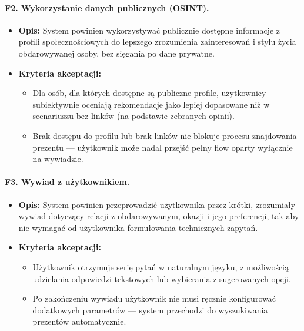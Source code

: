 \documentclass[12pt,a4paper]{article}
\begin{document}
\paragraph{F2. Wykorzystanie danych publicznych (OSINT).}
\begin{itemize}
    \item \textbf{Opis:} System powinien wykorzystywać publicznie dostępne informacje z profili społecznościowych do lepszego zrozumienia zainteresowań i stylu życia obdarowywanej osoby, bez sięgania po dane prywatne.
    \item \textbf{Kryteria akceptacji:}
    \begin{itemize}
        \item Dla osób, dla których dostępne są publiczne profile, użytkownicy subiektywnie oceniają rekomendacje jako lepiej dopasowane niż w scenariuszu bez linków (na podstawie zebranych opinii).
        \item Brak dostępu do profilu lub brak linków nie blokuje procesu znajdowania prezentu — użytkownik może nadal przejść pełny flow oparty wyłącznie na wywiadzie.
    \end{itemize}
\end{itemize}

\paragraph{F3. Wywiad z użytkownikiem.}
\begin{itemize}
    \item \textbf{Opis:} System powinien przeprowadzić użytkownika przez krótki, zrozumiały wywiad dotyczący relacji z obdarowywanym, okazji i jego preferencji, tak aby nie wymagać od użytkownika formułowania technicznych zapytań.
    \item \textbf{Kryteria akceptacji:}
    \begin{itemize}
        \item Użytkownik otrzymuje serię pytań w naturalnym języku, z możliwością udzielania odpowiedzi tekstowych lub wybierania z sugerowanych opcji.
        \item Po zakończeniu wywiadu użytkownik nie musi ręcznie konfigurować dodatkowych parametrów — system przechodzi do wyszukiwania prezentów automatycznie.
    \end{itemize}
\end{itemize}
\end{document}
